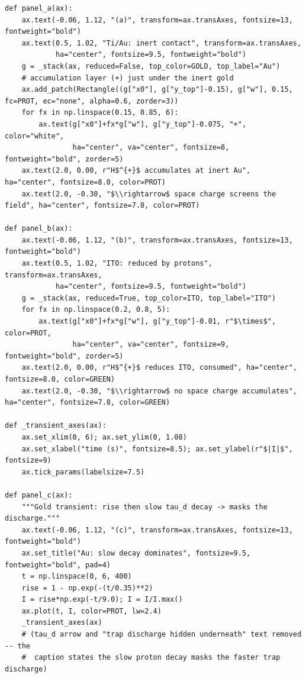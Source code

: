 \begin{lstlisting}[caption={schematics.ipynb code cell 2},label={lst:mrl-nb-schematics-2}]
def panel_a(ax):
    ax.text(-0.06, 1.12, "(a)", transform=ax.transAxes, fontsize=13, fontweight="bold")
    ax.text(0.5, 1.02, "Ti/Au: inert contact", transform=ax.transAxes,
            ha="center", fontsize=9.5, fontweight="bold")
    g = _stack(ax, reduced=False, top_color=GOLD, top_label="Au")
    # accumulation layer (+) just under the inert gold
    ax.add_patch(Rectangle((g["x0"], g["y_top"]-0.15), g["w"], 0.15, fc=PROT, ec="none", alpha=0.6, zorder=3))
    for fx in np.linspace(0.15, 0.85, 6):
        ax.text(g["x0"]+fx*g["w"], g["y_top"]-0.075, "+", color="white",
                ha="center", va="center", fontsize=8, fontweight="bold", zorder=5)
    ax.text(2.0, 0.00, r"H$^{+}$ accumulates at inert Au", ha="center", fontsize=8.0, color=PROT)
    ax.text(2.0, -0.30, "$\\rightarrow$ space charge screens the field", ha="center", fontsize=7.8, color=PROT)

def panel_b(ax):
    ax.text(-0.06, 1.12, "(b)", transform=ax.transAxes, fontsize=13, fontweight="bold")
    ax.text(0.5, 1.02, "ITO: reduced by protons", transform=ax.transAxes,
            ha="center", fontsize=9.5, fontweight="bold")
    g = _stack(ax, reduced=True, top_color=ITO, top_label="ITO")
    for fx in np.linspace(0.2, 0.8, 5):
        ax.text(g["x0"]+fx*g["w"], g["y_top"]-0.01, r"$\times$", color=PROT,
                ha="center", va="center", fontsize=9, fontweight="bold", zorder=5)
    ax.text(2.0, 0.00, r"H$^{+}$ reduces ITO, consumed", ha="center", fontsize=8.0, color=GREEN)
    ax.text(2.0, -0.30, "$\\rightarrow$ no space charge accumulates", ha="center", fontsize=7.8, color=GREEN)

def _transient_axes(ax):
    ax.set_xlim(0, 6); ax.set_ylim(0, 1.08)
    ax.set_xlabel("time (s)", fontsize=8.5); ax.set_ylabel(r"$|I|$", fontsize=9)
    ax.tick_params(labelsize=7.5)

def panel_c(ax):
    """Gold transient: rise then slow tau_d decay -> masks the discharge."""
    ax.text(-0.06, 1.12, "(c)", transform=ax.transAxes, fontsize=13, fontweight="bold")
    ax.set_title("Au: slow decay dominates", fontsize=9.5, fontweight="bold", pad=4)
    t = np.linspace(0, 6, 400)
    rise = 1 - np.exp(-(t/0.35)**2)
    I = rise*np.exp(-t/9.0); I = I/I.max()
    ax.plot(t, I, color=PROT, lw=2.4)
    _transient_axes(ax)
    # (tau_d arrow and "trap discharge hidden underneath" text removed -- the
    #  caption states the slow proton decay masks the faster trap discharge)


\end{lstlisting}
